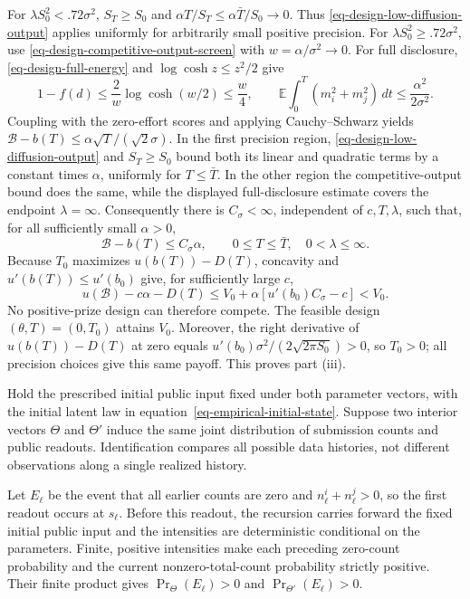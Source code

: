 \documentclass[mnsc]{informs3}
\begin{document}
\begin{APPENDICES}
{For $\lambda S_0^2<.72\sigma^2$, $S_T\geq S_0$ and
$\alpha T/S_T\leq\alpha\bar T/S_0\to0$.
Thus \eqref{eq-design-low-diffusion-output} applies uniformly for arbitrarily
small positive precision.
For $\lambda S_0^2\geq.72\sigma^2$, use
\eqref{eq-design-competitive-output-screen} with $w=\alpha/\sigma^2\to0$.
For full disclosure, \eqref{eq-design-full-energy} and
$\log\cosh z\leq z^2/2$ give
\[
1-f(d)\leq\frac2w\log\cosh(w/2)\leq\frac w4,
\qquad
\mathbb E\int_0^T(m_i^2+m_j^2)\,dt\leq\frac{\alpha^2}{2\sigma^2}.
\]
Coupling with the zero-effort scores and applying Cauchy--Schwarz yields
$\mathcal B-b(T)\leq\alpha\sqrt{T}/(\sqrt2\sigma)$.
In the first precision region, \eqref{eq-design-low-diffusion-output}
and $S_T\geq S_0$ bound both its linear and quadratic terms by a constant
times $\alpha$, uniformly for $T\leq\bar T$. In the other region the
competitive-output bound does the same, while the displayed
full-disclosure estimate covers the endpoint $\lambda=\infty$.
Consequently there is $C_\sigma<\infty$, independent of $c,T,\lambda$,
such that, for all sufficiently small $\alpha>0$,
\[
\mathcal B-b(T)\leq C_\sigma\alpha,
\qquad 0\leq T\leq\bar T,\quad 0<\lambda\leq\infty.
\]
Because $T_0$ maximizes $u(b(T))-D(T)$, concavity and
$u'(b(T))\leq u'(b_0)$ give, for sufficiently large $c$,
\[
u(\mathcal B)-c\alpha-D(T)
\leq V_0+\alpha\left[u'(b_0)C_\sigma-c\right]<V_0.
\]
No positive-prize design can therefore compete. The feasible design
$(\theta,T)=(0,T_0)$ attains $V_0$. Moreover, the right derivative of
$u(b(T))-D(T)$ at zero equals
$u'(b_0)\sigma^2/(2\sqrt{2\pi S_0})>0$, so $T_0>0$;
all precision choices give this same payoff. {This proves part (iii).}
\Halmos
\endproof
}


{
Hold the prescribed initial public input fixed under both parameter vectors, with the initial latent law in equation~\eqref{eq-empirical-initial-state}. Suppose two interior vectors $\Theta$ and $\Theta'$ induce the same joint distribution of submission counts and public readouts. Identification compares all possible data histories, not different observations along a single realized history.

Let $E_\ell$ be the event that all earlier counts are zero and $n^i_\ell+n^j_\ell>0$, so the first readout occurs at $s_\ell$. Before this readout, the recursion carries forward the fixed initial public input and the intensities are deterministic conditional on the parameters. Finite, positive intensities make each preceding zero-count probability and the current nonzero-total-count probability strictly positive. Their finite product gives $\Pr_\Theta(E_\ell)>0$ and $\Pr_{\Theta'}(E_\ell)>0$.

}
\end{APPENDICES}
\end{document}

